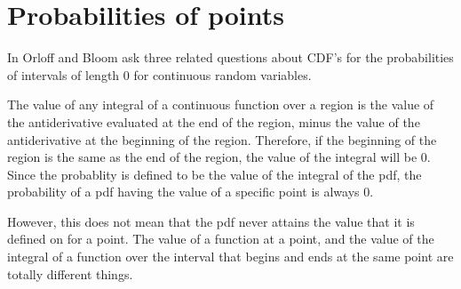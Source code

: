 \documentclass[a4paper,11pt]{article}
\begin{document}
\section{Probabilities of points}
In \cite{reading5b} Orloff and Bloom ask three related questions about CDF's
for the probabilities of intervals of length 0 for continuous random variables.

The value of any integral of a continuous function over a region is the
value of the antiderivative evaluated at the end of the region, minus the value
of the antiderivative at the beginning of the region.  Therefore, if the
beginning of the region is the same as the end of the region, the value of the
integral will be 0.  Since the probablity is defined to be the value of the
integral of the pdf, the probability of a pdf having the value of a specific
point is always 0.

However, this does not mean that the pdf never attains the value that it is
defined on for a point. The value of a function at a point, and the value of
the integral of a function over the interval that begins and ends at the same
point are totally different things.

\printbibliography{}
\end{document}
